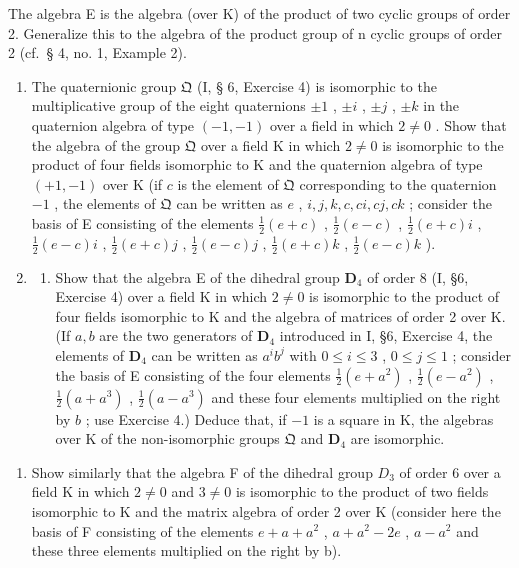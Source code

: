 The algebra E is the algebra (over K) of the product of two cyclic groups of order 2. Generalize this to the algebra of the product group of n cyclic groups of order 2 (cf.~§ 4, no. 1, Example 2).

\begin{enumerate}
\def\labelenumi{\arabic{enumi}.}
\setcounter{enumi}{7}
\item
  The quaternionic group \(\mathfrak{Q}\) (I, § 6, Exercise 4) is isomorphic to the multiplicative group of the eight quaternions \(\pm 1\) , \(\pm i\) , \(\pm j\) , \(\pm k\) in the quaternion algebra of type \((-1, -1)\) over a field in which \(2 \neq 0\) . Show that the algebra of the group \(\mathfrak{Q}\) over a field K in which \(2 \neq 0\) is isomorphic to the product of four fields isomorphic to K and the quaternion algebra of type \((+1, -1)\) over K (if \(c\) is the element of \(\mathfrak{Q}\) corresponding to the quaternion \(-1\) , the elements of \(\mathfrak{Q}\) can be written as \(e\) , \(i, j, k, c, ci, cj, ck\) ; consider the basis of E consisting of the elements \(\frac{1}{2}(e + c)\) , \(\frac{1}{2}(e - c)\) , \(\frac{1}{2}(e + c)i\) , \(\frac{1}{2}(e - c)i\) , \(\frac{1}{2}(e + c)j\) , \(\frac{1}{2}(e - c)j\) , \(\frac{1}{2}(e + c)k\) , \(\frac{1}{2}(e - c)k\) ).
\item
  \begin{enumerate}
  \def\labelenumii{(\alph{enumii})}
  \tightlist
  \item
    Show that the algebra E of the dihedral group \(\mathbf{D}_4\) of order 8 (I, §6, Exercise 4) over a field K in which \(2 \neq 0\) is isomorphic to the product of four fields isomorphic to K and the algebra of matrices of order 2 over K. (If \(a, b\) are the two generators of \(\mathbf{D}_4\) introduced in I, §6, Exercise 4, the elements of \(\mathbf{D}_4\) can be written as \(a^i b^j\) with \(0 \leqslant i \leqslant 3\) , \(0 \leqslant j \leqslant 1\) ; consider the basis of E consisting of the four elements \(\frac{1}{2}(e + a^2)\) , \(\frac{1}{2}(e - a^2)\) , \(\frac{1}{2}(a + a^3)\) , \(\frac{1}{2}(a - a^3)\) and these four elements multiplied on the right by \(b\) ; use Exercise 4.) Deduce that, if \(-1\) is a square in K, the algebras over K of the non-isomorphic groups \(\mathfrak{Q}\) and \(\mathbf{D}_4\) are isomorphic.
  \end{enumerate}
\end{enumerate}

\begin{enumerate}
\def\labelenumi{(\alph{enumi})}
\setcounter{enumi}{1}
\tightlist
\item
  Show similarly that the algebra F of the dihedral group \(D_{3}\) of order 6 over a field K in which \(2 \neq 0\) and \(3 \neq 0\) is isomorphic to the product of two fields isomorphic to K and the matrix algebra of order 2 over K (consider here the basis of F consisting of the elements \(e + a + a^{2}\) , \(a + a^{2} - 2e\) , \(a - a^{2}\) and these three elements multiplied on the right by b).
\end{enumerate}

